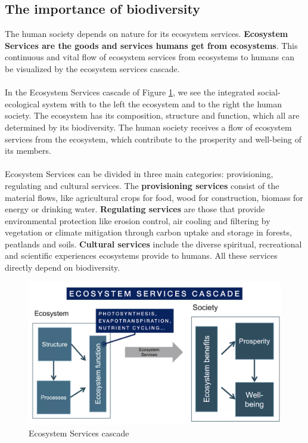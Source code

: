\documentclass[../summary.tex]{subfiles}
\begin{document}
	
	\subsection{The importance of biodiversity}
	The human society depends on nature for its ecosystem services. \textbf{Ecosystem Services are the goods and services humans get from ecosystems}. This continuous and vital flow of ecosystem services from ecosystems to humans can be visualized by the ecosystem services cascade.
	\\
	\\
	In the Ecosystem Services cascade of Figure \ref{fig:ecosystems_services_cascade}, we see the integrated social-ecological system with to the left the ecosystem and to the right the human society. The ecosystem has its composition, structure and function, which all are determined by its biodiversity. The human society receives a flow of ecosystem services from the ecosystem, which contribute to the prosperity and well-being of its members. 
	\\
	\\
	Ecosystem Services can be divided in three main categories: provisioning, regulating and cultural services. The \textbf{provisioning services} consist of the material flows, like agricultural crops for food, wood for construction, biomass for energy or drinking water. \textbf{Regulating services} are those that provide environmental protection like erosion control, air cooling and filtering by vegetation or climate mitigation through carbon uptake and storage in forests, peatlands and soils. \textbf{Cultural services} include the diverse spiritual, recreational and scientific experiences ecosystems provide to humans. All these services directly depend on biodiversity.
	
	\begin{figure}[htbp]
		\centering
		\includegraphics[width=0.9\linewidth]{images/2-ecosystem-services-cascade.png}
		\caption{Ecosystem Services cascade}
		\label{fig:ecosystems_services_cascade}
	\end{figure}
	
\end{document}
